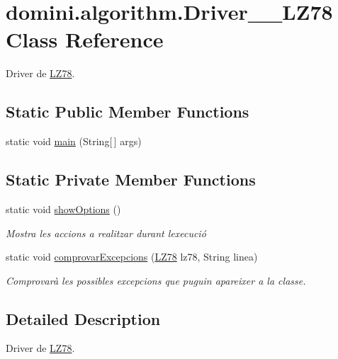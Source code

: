 \hypertarget{classdomini_1_1algorithm_1_1Driver____LZ78}{}\section{domini.\+algorithm.\+Driver\+\_\+\+\_\+\+L\+Z78 Class Reference}
\label{classdomini_1_1algorithm_1_1Driver____LZ78}


Driver de \hyperlink{classdomini_1_1algorithm_1_1LZ78}{L\+Z78}.  


\subsection*{Static Public Member Functions}
\begin{DoxyCompactItemize}
\item 
static void \hyperlink{classdomini_1_1algorithm_1_1Driver____LZ78_a3f8db12503ffe92702d5b6670c56e792}{main} (String\mbox{[}$\,$\mbox{]} args)
\end{DoxyCompactItemize}
\subsection*{Static Private Member Functions}
\begin{DoxyCompactItemize}
\item 
static void \hyperlink{classdomini_1_1algorithm_1_1Driver____LZ78_af5e77bd40dbe6c3fa84ee5ee996b6dfe}{show\+Options} ()
\begin{DoxyCompactList}\small\item\em Mostra les accions a realitzar durant l\textquotesingle{}execució \end{DoxyCompactList}\item 
static void \hyperlink{classdomini_1_1algorithm_1_1Driver____LZ78_a21b185a3310ced322a1eb1b49f889f15}{comprovar\+Excepcions} (\hyperlink{classdomini_1_1algorithm_1_1LZ78}{L\+Z78} lz78, String linea)
\begin{DoxyCompactList}\small\item\em Comprovarà les possibles excepcions que puguin apareixer a la classe. \end{DoxyCompactList}\end{DoxyCompactItemize}


\subsection{Detailed Description}
Driver de \hyperlink{classdomini_1_1algorithm_1_1LZ78}{L\+Z78}. 

